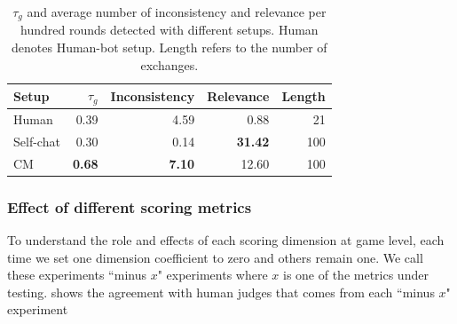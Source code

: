 \begin{table}[ht!]
\centering
\scriptsize
\begin{tabular}{lrrrr}
\toprule
Setup& $\tau_{g}$  & Inconsistency & Relevance &Length   \\ \midrule
Human& 0.39   &4.59& 0.88 &21   \\
Self-chat & 0.30  & 0.14 & \textbf{31.42} & 100\\
CM& \textbf{0.68}  & \textbf{7.10} & 12.60&100 \\
\bottomrule
\end{tabular}
\caption{
$\tau_{g}$ and average number of 
inconsistency and relevance
per hundred rounds detected with 
different setups. 
Human denotes Human-bot setup. 
Length refers to the number of exchanges.
}
\label{tab:frame}
\end{table} 

 


\subsubsection{Effect of different scoring metrics}
To understand the role and effects of each
scoring dimension at game level, 
each time we set one dimension coefficient to zero
and others remain one. We call these experiments
``minus $x$" experiments where $x$ is one of the 
metrics under testing.  
 shows the agreement with human judges 
that comes from each ``minus $x$" experiment 

